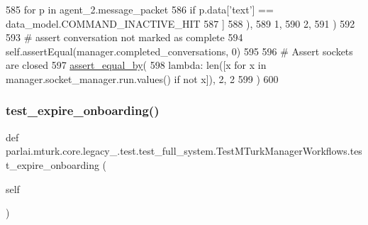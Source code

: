 \begin{DoxyCode}
585                     \textcolor{keywordflow}{for} p \textcolor{keywordflow}{in} agent\_2.message\_packet
586                     \textcolor{keywordflow}{if} p.data[\textcolor{stringliteral}{'text'}] == data\_model.COMMAND\_INACTIVE\_HIT
587                 ]
588             ),
589             1,
590             2,
591         )
592 
593         \textcolor{comment}{# assert conversation not marked as complete}
594         self.assertEqual(manager.completed\_conversations, 0)
595 
596         \textcolor{comment}{# Assert sockets are closed}
597         \hyperlink{namespaceparlai_1_1mturk_1_1core_1_1test_1_1test__full__system_a0b463246d35658a2e422010f13dcf819}{assert\_equal\_by}(
598             \textcolor{keyword}{lambda}: len([x \textcolor{keywordflow}{for} x \textcolor{keywordflow}{in} manager.socket\_manager.run.values() \textcolor{keywordflow}{if} \textcolor{keywordflow}{not} x]), 2, 2
599         )
600 
\end{DoxyCode}
\mbox{\label{classparlai_1_1mturk_1_1core_1_1legacy__2018_1_1test_1_1test__full__system_1_1TestMTurkManagerWorkflows_a5301ddab598be8dd5efc3231e6f0ae75}} 
\subsubsection{\texorpdfstring{test\+\_\+expire\+\_\+onboarding()}{test\_expire\_onboarding()}}
{\footnotesize\ttfamily def parlai.\+mturk.\+core.\+legacy\+\_.\+test.\+test\+\_\+full\+\_\+system.\+Test\+M\+Turk\+Manager\+Workflows.\+test\+\_\+expire\+\_\+onboarding (\begin{DoxyParamCaption}\item[{}]{self }\end{DoxyParamCaption})}




